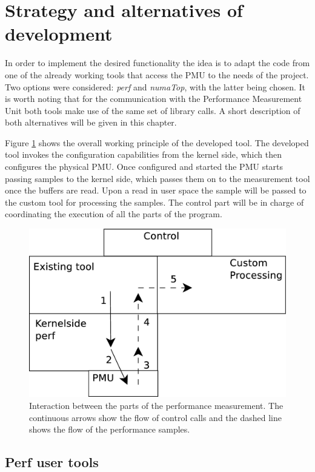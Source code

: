 \section{Strategy and alternatives of development}\label{section:strat}
In order to implement the desired functionality the idea is to adapt the code from one of the already working tools that access the PMU to the needs of the project. Two options were considered: \textit{perf} and \textit{numaTop}, with the latter being chosen. It is worth noting that for the communication with the Performance Measurement Unit both tools make use of the same set of library calls. A short description of both alternatives will be given in this chapter.

Figure \ref{fig:dstrategy} shows the overall working principle of the developed tool. The developed tool invokes the configuration capabilities from the kernel side, which then configures the physical PMU. Once configured and started the PMU starts passing samples to the kernel side, which passes them on to the measurement tool once the buffers are read. Upon a read in user space the sample will be passed to the custom tool for processing the samples. The control part will be in charge of coordinating the execution of all the parts of the program.

\begin{figure}[ht]
	\centering
		\includegraphics[width=.8\textwidth]{figures/dev-strategy.eps}
		\caption[Flow of information in the development]{Interaction between the parts of the performance measurement. The continuous arrows show the flow of control calls and the dashed line shows the flow of the performance samples.}
		\label{fig:dstrategy}
\end{figure}
\subsection{Perf user tools}\label{section:perf-ut}

